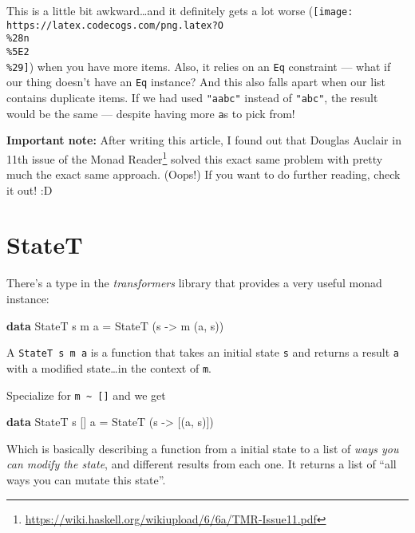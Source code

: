 \documentclass[]{article}
\newenvironment{Shaded}{}{}
\newcommand{\DataTypeTok}[1]{\textcolor[rgb]{0.56,0.13,0.00}{#1}}
\newcommand{\KeywordTok}[1]{\textcolor[rgb]{0.00,0.44,0.13}{\textbf{#1}}}
\newcommand{\NormalTok}[1]{#1}
\newcommand{\OtherTok}[1]{\textcolor[rgb]{0.00,0.44,0.13}{#1}}
\renewcommand{\href}[2]{#2\footnote{\url{#1}}}
\begin{document}
This is a little bit awkward\ldots and it definitely gets a lot worse
(\texttt{[image: https://latex.codecogs.com/png.latex?O\\\%28n\\\%5E2\\\%29]}) when
you have more items. Also, it relies on an \texttt{Eq} constraint --- what if
our thing doesn't have an \texttt{Eq} instance? And this also falls apart when
our list contains duplicate items. If we had used \texttt{"aabc"} instead of
\texttt{"abc"}, the result would be the same --- despite having more
\texttt{\textquotesingle{}a\textquotesingle{}}s to pick from!

\textbf{Important note:} After writing this article, I found out that Douglas
Auclair in \href{https://wiki.haskell.org/wikiupload/6/6a/TMR-Issue11.pdf}{11th
issue of the Monad Reader} solved this exact same problem with pretty much the
exact same approach. (Oops!) If you want to do further reading, check it out! :D

\hypertarget{statet}{%
\section{StateT}\label{statet}}

There's a type in the \emph{transformers} library that provides a very useful
monad instance:

\begin{Shaded}
\begin{Highlighting}[]
\KeywordTok{data} \DataTypeTok{StateT}\NormalTok{ s m a }\OtherTok{=} \DataTypeTok{StateT}\NormalTok{ (s }\OtherTok{{-}>}\NormalTok{ m (a, s))}
\end{Highlighting}
\end{Shaded}

A \texttt{StateT\ s\ m\ a} is a function that takes an initial state \texttt{s}
and returns a result \texttt{a} with a modified state\ldots in the context of
\texttt{m}.

Specialize for \texttt{m\ \textasciitilde{}\ {[}{]}} and we get

\begin{Shaded}
\begin{Highlighting}[]
\KeywordTok{data} \DataTypeTok{StateT}\NormalTok{ s [] a }\OtherTok{=} \DataTypeTok{StateT}\NormalTok{ (s }\OtherTok{{-}>}\NormalTok{ [(a, s)])}
\end{Highlighting}
\end{Shaded}

Which is basically describing a function from a initial state to a list of
\emph{ways you can modify the state}, and different results from each one. It
returns a list of ``all ways you can mutate this state''.
\end{document}
